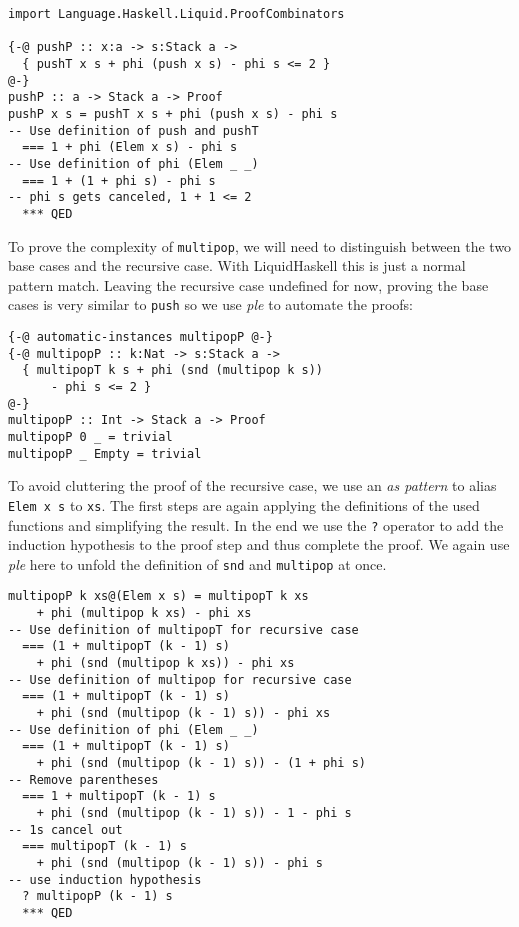\documentclass[sigplan,screen,review,anonymous]{acmart}
\begin{document}
\begin{lstlisting}
import Language.Haskell.Liquid.ProofCombinators

{-@ pushP :: x:a -> s:Stack a ->
  { pushT x s + phi (push x s) - phi s <= 2 }
@-}
pushP :: a -> Stack a -> Proof
pushP x s = pushT x s + phi (push x s) - phi s
-- Use definition of push and pushT
  === 1 + phi (Elem x s) - phi s
-- Use definition of phi (Elem _ _)
  === 1 + (1 + phi s) - phi s
-- phi s gets canceled, 1 + 1 <= 2
  *** QED
\end{lstlisting}

To prove the complexity of \texttt{multipop}, we will need to distinguish between the two base cases and the recursive case. With LiquidHaskell this is just a normal pattern match. Leaving the recursive case undefined for now, proving the base cases is very similar to \texttt{push} so we use \textit{ple} to automate the proofs:

\begin{lstlisting}
{-@ automatic-instances multipopP @-}
{-@ multipopP :: k:Nat -> s:Stack a ->
  { multipopT k s + phi (snd (multipop k s))
      - phi s <= 2 }
@-}
multipopP :: Int -> Stack a -> Proof
multipopP 0 _ = trivial
multipopP _ Empty = trivial
\end{lstlisting}

To avoid cluttering the proof of the recursive case, we use an \textit{as pattern} to alias \texttt{Elem x s} to \texttt{xs}. The first steps are again applying the definitions of the used functions and simplifying the result. In the end we use the \texttt{?} operator to add the induction hypothesis to the proof step and thus complete the proof. We again use \textit{ple} here to unfold the definition of \texttt{snd} and \texttt{multipop} at once.

\begin{lstlisting}
multipopP k xs@(Elem x s) = multipopT k xs
    + phi (multipop k xs) - phi xs
-- Use definition of multipopT for recursive case
  === (1 + multipopT (k - 1) s)
    + phi (snd (multipop k xs)) - phi xs
-- Use definition of multipop for recursive case
  === (1 + multipopT (k - 1) s)
    + phi (snd (multipop (k - 1) s)) - phi xs
-- Use definition of phi (Elem _ _)
  === (1 + multipopT (k - 1) s)
    + phi (snd (multipop (k - 1) s)) - (1 + phi s)
-- Remove parentheses
  === 1 + multipopT (k - 1) s
    + phi (snd (multipop (k - 1) s)) - 1 - phi s
-- 1s cancel out
  === multipopT (k - 1) s
    + phi (snd (multipop (k - 1) s)) - phi s
-- use induction hypothesis
  ? multipopP (k - 1) s
  *** QED
\end{lstlisting}
\end{document}
